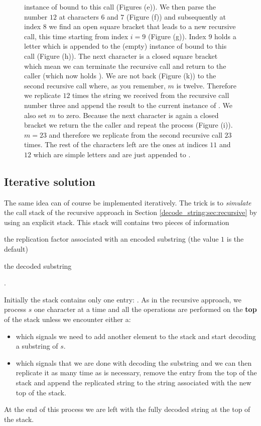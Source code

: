 \begin{figure}
{	instance of  bound to this call (Figures (e)). We then parse the number $12$ at
	characters $6$ and $7$ (Figure (f)) and subsequently at index $8$ we find an open square bracket
	that leads to a new recursive call, this time starting from index $i=9$ (Figure (g)). Index $9$ holds
	a letter which is appended to the (empty) instance of  bound to this call (Figure
	(h)). The next character is a closed square bracket which mean we can terminate the recursive
	call and return to the caller  (which now holds ). We are not back
	(Figure (k)) to the second recursive call where, as you remember, $m$ is twelve. Therefore we
	replicate $12$ times the string we received from the recursive call number three and append the
	result to the current instance of . We also set $m$ to zero. Because the next
	character is again a closed bracket we return the the caller and repeat the process (Figure
	(i)).$m=23$ and therefore we replicate  from the second recursive call $23$ times.
	The rest of the characters left are the ones at indices $11$ and $12$ which are simple letters
	and are just appended to .}	
   \label{fig:decode_string:recursion}
 \end{figure}

 \subsection{Iterative solution}
 \label{decode_string:sec:iterative}
The same idea can of course be implemented iteratively. The trick is to \textit{simulate} the call
stack of the recursive approach in Section \ref{decode_string:sec:recursive} by using an explicit
stack. This stack will contains two pieces of information 
\begin{enumerate*}
	\item the replication factor associated with an encoded substring (the value $1$ is the default)
	\item the decoded substring
\end{enumerate*}. 
	
Initially the stack contains only one entry: . 
As in the recursive approach, we process $s$ one character at a time and all the
operations are performed on the \textbf{top} of the stack unless we encounter either a: 
\begin{itemize}
	\item \inline{'['} which
	signals we need to add another element to the stack and start decoding a substring of $s$.
	\item \inline{']'} which signals that we are done with decoding the substring and we can then replicate it
	as many time as is necessary, remove the entry from the top of the stack and append the replicated
	string to the string associated with the new top of the stack.
\end{itemize}
At the end of this process we are
left with the fully decoded string at the top of the stack.

